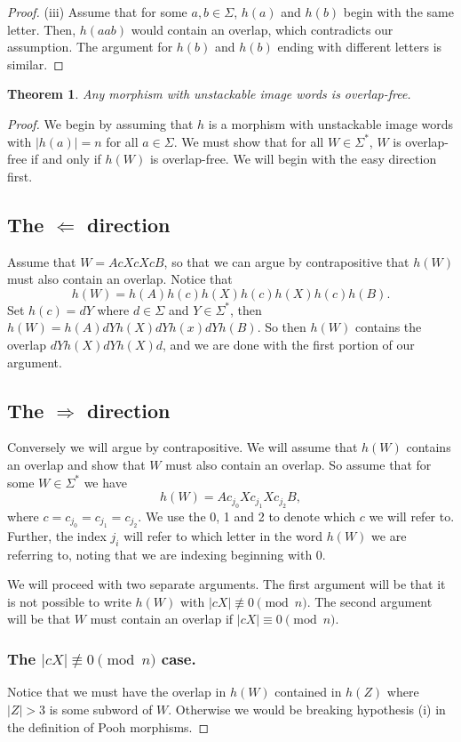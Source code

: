 \documentclass[12pt]{amsart}
\newtheorem{thm}{Theorem}[section]
\theoremstyle{definition}
\theoremstyle{plain}
\theoremstyle{nameit}
\theoremstyle{plain}
\begin{document}
\begin{onehalfspace}
\begin{proof}
(iii) Assume that for some $a,b\in\Sigma$, $h(a)$ and $h(b)$ begin with the same letter. Then,
$h(aab)$ would contain an overlap, which contradicts our assumption. The argument for $h(b)$ and
$h(b)$ ending with different letters is similar.
\end{proof}

\begin{thm}
Any morphism with unstackable image words is overlap-free.
\label{thm_5_3}
\end{thm}

\begin{proof}
We begin by assuming that $h$ is a morphism with unstackable image words with
$|h(a)|=n$ for all $a\in\Sigma$. We must show
that for all $W\in\Sigma^*$, $W$
is overlap-free if and only if $h(W)$ is overlap-free. We will begin with the easy direction first.

\subsection{The $\Leftarrow$ direction} Assume that $W=AcXcXcB$, so that we can argue by
contrapositive that $h(W)$ must also contain an
overlap. Notice that
\[h(W) = h(A)h(c)h(X)h(c)h(X)h(c)h(B).\]
Set $h(c) = dY$ where $d\in\Sigma$ and $Y\in\Sigma^*$, then $h(W) = h(A)dYh(X)dYh(x)dYh(B)$.
So then $h(W)$ contains the overlap $dYh(X)dYh(X)d$, and we are done with the first portion of our
argument.

\subsection{The $\Rightarrow$ direction}Conversely we will argue by contrapositive. We will assume that
$h(W)$ contains an overlap and show
that $W$ must also contain an overlap. So assume that for some $W\in\Sigma^*$ we have
\begin{displaymath}
h(W) = Ac_{j_0}Xc_{j_1}Xc_{j_2}B,
\end{displaymath}
where $c=c_{j_0}=c_{j_1}=c_{j_2}$. We use the 0, 1 and 2 to denote which $c$ we will refer to. Further,
the index $j_i$ will refer to which letter in the word $h(W)$ we are referring to, noting that we are indexing
beginning with 0.

We will proceed with two separate arguments. The first argument will be that it is not possible to write
$h(W)$ with $|cX|\not\equiv 0\pmod{n}$. The second argument will be that $W$ must contain an overlap
if $|cX|\equiv 0 \pmod{n}$.

\subsubsection{The $|cX|\not\equiv 0\pmod{n}$ case.} Notice that we must have the overlap in $h(W)$
contained
in $h(Z)$ where $|Z|>3$ is some subword of $W$. Otherwise we would be breaking hypothesis (i) in the
definition of Pooh morphisms.


\end{proof}
\end{onehalfspace}
\end{document}
